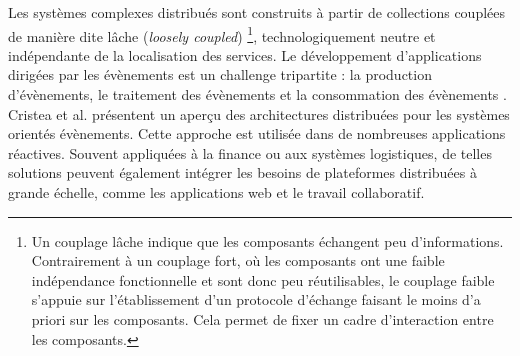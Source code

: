 Les systèmes complexes distribués sont construits à partir de collections 
couplées de manière dite \og lâche\fg{} (\textit{loosely coupled}) \footnote{Un 
	couplage lâche indique que les 
	composants échangent peu d'informations. Contrairement à un couplage fort, où 
	les 
	composants ont une faible indépendance fonctionnelle et sont donc peu 
	réutilisables, le couplage faible s'appuie sur l'établissement d'un protocole 
	d'échange faisant le moins d'a priori sur les composants. Cela permet de fixer 
	un 
	cadre d'interaction entre les composants.}, technologiquement neutre 
et indépendante de la localisation des services. 
Le développement d'applications dirigées par les évènements est un challenge 
tripartite : la production d'évènements, le traitement des évènements et la 
consommation des évènements \cite{Chandy2011}.
Cristea et al. \cite{Cristea2011} présentent un aperçu des architectures distribuées 
pour les systèmes orientés évènements. 
Cette approche est utilisée dans de nombreuses applications réactives. Souvent 
appliquées à la finance ou aux systèmes logistiques, de telles solutions peuvent 
également intégrer les besoins de plateformes distribuées à grande échelle, 
comme les applications web et le travail collaboratif. 



